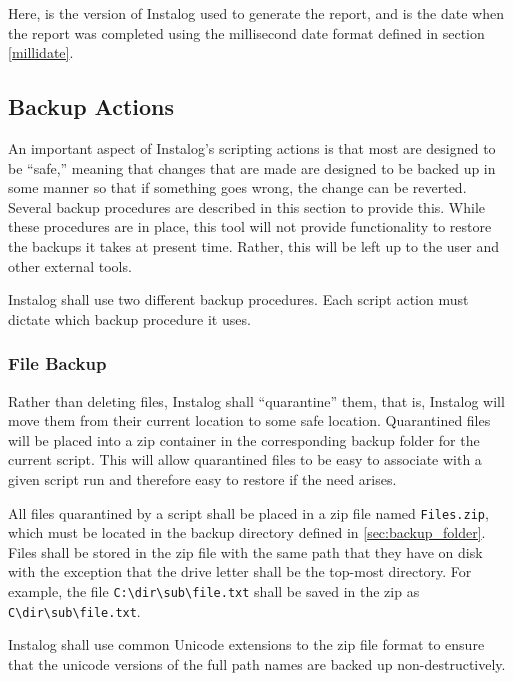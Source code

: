 Here,  is the version of Instalog used to generate the report, and
 is the date when the report was completed using the millisecond date
format defined in section \ref{millidate}.

\subsection{Backup Actions}
An important aspect of Instalog's scripting actions is that most are designed to
be ``safe,'' meaning that changes that are made are designed to be backed up in
some manner so that if something goes wrong, the change can be reverted. 
Several backup procedures are described in this section to provide this.  While
these procedures are in place, this tool will not provide functionality to
restore the backups it takes at present time.  Rather, this will be left up to
the user and other external tools.

Instalog shall use two different backup procedures.  Each script action must
dictate which backup procedure it uses.  
\subsubsection{File Backup} \label{sec:file_backup}
Rather than deleting files, Instalog shall ``quarantine'' them, that is,
Instalog will move them from their current location to some safe location. 
Quarantined files will be placed into a zip container in the corresponding
backup folder for the current script.  This will allow quarantined files to be
easy to associate with a given script run and therefore easy to restore if the
need arises.  

All files quarantined by a script shall be placed in a zip file named
\verb|Files.zip|, which must be located in the backup directory defined in
\ref{sec:backup_folder}.  Files shall be stored in the zip file with the same
path that they have on disk with the exception that the drive letter shall be
the top-most directory.  For example, the file \verb|C:\dir\sub\file.txt| shall
be saved in the zip as \verb|C\dir\sub\file.txt|.

Instalog shall use common Unicode extensions to the zip file format to ensure
that the unicode versions of the full path names are backed up
non-destructively.
